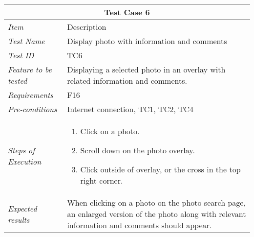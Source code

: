 %
\begin{minipage}{\linewidth}
\setlength{\tabcolsep}{15pt}
\centering
{}
\begin{tabular}{ |l|p{70mm}| }
	\hline
	\multicolumn{2}{|c|}{\cellcolor{gray!25} \textbf{Test Case 6}} \\
	\hline
	\it{\cellcolor{gray!25}Item} & {\cellcolor{gray!25} Description } \\
	\hline
	\it{\cellcolor{gray!25}Test Name } & Display photo with information and comments \\ \hline
	\it{\cellcolor{gray!25}Test ID} & TC6 \\ \hline
	\it{\cellcolor{gray!25}Feature to be tested} & Displaying a selected photo in an overlay with related information and comments. \\ \hline
	\it{\cellcolor{gray!25}Requirements} & F16  \\ \hline
	\it{\cellcolor{gray!25}Pre-conditions} & Internet connection, TC1, TC2, TC4  \\ \hline
	\it{\cellcolor{gray!25}Steps of Execution} & \begin{enumerate}
	                                       \item Click on a photo.
	                                       \item Scroll down on the photo overlay.
	                                       \item Click outside of overlay, or the cross in the top right corner.
	                                     \end{enumerate} \\ \hline
	\it{\cellcolor{gray!25}Expected results} & When clicking on a photo on the photo search page, an enlarged version of the photo along with relevant information and comments should appear. \\
	\hline
\end{tabular}
\medskip
\end{minipage}
%
